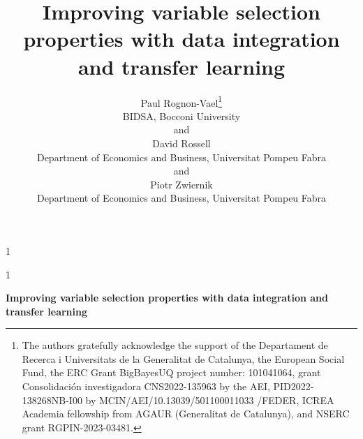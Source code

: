 \documentclass[
  12pt]{article}
\newcommand{\anon}{1}
\begin{document}
\def\spacingset#1{\renewcommand{\baselinestretch}%
{#1}\small\normalsize} \spacingset{1}




\anon
{
  \title{\bf Improving variable selection properties with data integration and transfer learning}
  \author{Paul Rognon-Vael\thanks{
    The authors gratefully acknowledge the support of the Departament de Recerca i Universitats de la Generalitat de Catalunya, the European Social Fund, the ERC Grant BigBayesUQ project number: 101041064, grant Consolidaci\'on investigadora CNS2022-135963 by the AEI, PID2022-138268NB-I00 by MCIN/AEI/10.13039/501100011033 /FEDER, ICREA Academia fellowship from AGAUR (Generalitat de Catalunya), and NSERC grant RGPIN-2023-03481.}\hspace{.2cm}\\
    BIDSA, Bocconi University\\
    and \\
    David Rossell \\
    Department of Economics and Business, Universitat Pompeu Fabra \\
    and \\
    Piotr Zwiernik \\
    Department of Economics and Business, Universitat Pompeu Fabra}
  \maketitle
} \fi

\anon
{
  \bigskip
  \bigskip
  \bigskip
  \begin{center}
    {\LARGE\bf Improving variable selection properties with data integration and transfer learning}
\end{center}
  \medskip
} \fi
\end{document}
